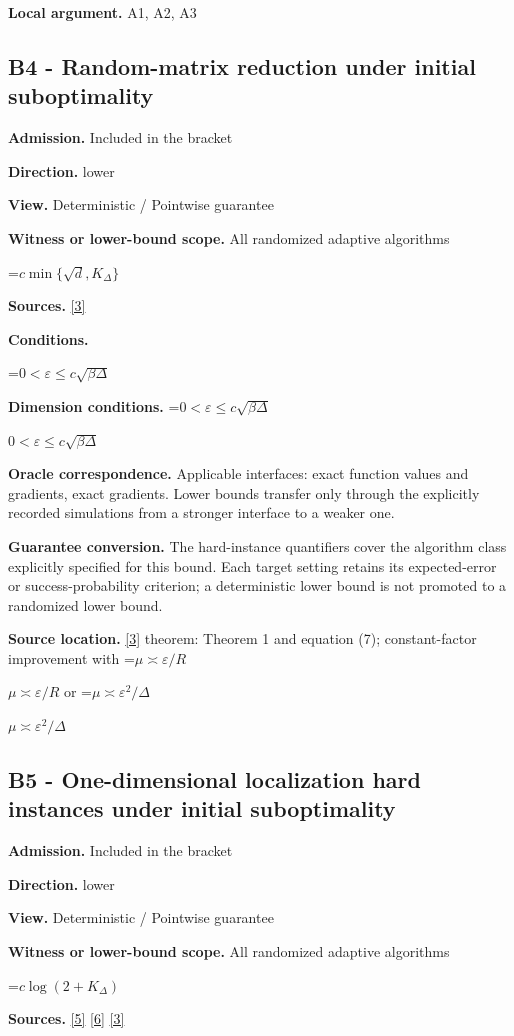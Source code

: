 \documentclass[10pt,a4paper]{article}
\newcommand{\AtlasMath}[1]{\par\begingroup\centering\setbox0=\hbox{$\displaystyle #1$}\ifdim\wd0>1.4\linewidth\typeout{ATLAS WIDE FORMULA: \the\wd0}\fi\ifdim\wd0>\linewidth\resizebox{\linewidth}{!}{\box0}\else\box0\fi\par\endgroup}
\newcommand{\AtlasInlineMath}[1]{\begingroup\setbox0=\hbox{$#1$}\ifdim\wd0>.4\linewidth\endgroup\AtlasMath{#1}\else\endgroup$#1$\fi}
\begin{document}
\textbf{Local argument.} A1, A2, A3

\subsection{B4 - Random-matrix reduction under initial suboptimality}
\textbf{Admission.} Included in the bracket

\textbf{Direction.} lower

\textbf{View.} Deterministic / Pointwise guarantee

\textbf{Witness or lower-bound scope.} All randomized adaptive algorithms

\AtlasMath{c\min\{\sqrt d,K_\Delta\}}
\textbf{Sources.} \href{https://arxiv.org/pdf/2609.10874}{[3]}

\textbf{Conditions.} 
\AtlasMath{0<\varepsilon\le c\sqrt{\beta\Delta}}


\textbf{Dimension conditions.} \AtlasInlineMath{0<\varepsilon\le c\sqrt{\beta\Delta}}

\textbf{Oracle correspondence.} Applicable interfaces: exact function values and gradients, exact gradients. Lower bounds transfer only through the explicitly recorded simulations from a stronger interface to a weaker one.

\textbf{Guarantee conversion.} The hard-instance quantifiers cover the algorithm class explicitly specified for this bound. Each target setting retains its expected-error or success-probability criterion; a deterministic lower bound is not promoted to a randomized lower bound.

\textbf{Source location.} \href{https://arxiv.org/pdf/2609.10874}{[3]} theorem: Theorem 1 and equation (7); constant-factor improvement with \AtlasInlineMath{\mu\asymp\varepsilon/R} or \AtlasInlineMath{\mu\asymp\varepsilon^2/\Delta}

\subsection{B5 - One-dimensional localization hard instances under initial suboptimality}
\textbf{Admission.} Included in the bracket

\textbf{Direction.} lower

\textbf{View.} Deterministic / Pointwise guarantee

\textbf{Witness or lower-bound scope.} All randomized adaptive algorithms

\AtlasMath{c\log(2+K_\Delta)}
\textbf{Sources.} \href{https://arxiv.org/pdf/2101.09740v2}{[5]} \href{https://arxiv.org/pdf/2609.33360v2}{[6]} \href{https://arxiv.org/pdf/2609.10874}{[3]}
\end{document}
